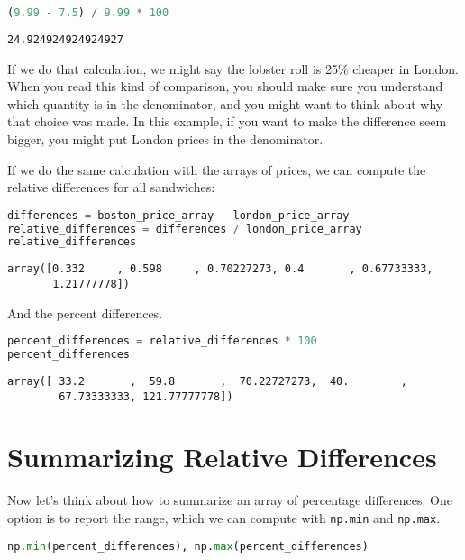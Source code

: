 \documentclass[
]{book}
\newcommand{\passthrough}[1]{#1}
\begin{document}
\begin{lstlisting}[language=Python]
(9.99 - 7.5) / 9.99 * 100
\end{lstlisting}

\begin{lstlisting}
24.924924924924927
\end{lstlisting}

If we do that calculation, we might say the lobster roll is 25\% cheaper
in London. When you read this kind of comparison, you should make sure
you understand which quantity is in the denominator, and you might want
to think about why that choice was made. In this example, if you want to
make the difference seem bigger, you might put London prices in the
denominator.

If we do the same calculation with the arrays of prices, we can compute
the relative differences for all sandwiches:

\begin{lstlisting}[language=Python]
differences = boston_price_array - london_price_array
relative_differences = differences / london_price_array
relative_differences
\end{lstlisting}

\begin{lstlisting}
array([0.332     , 0.598     , 0.70227273, 0.4       , 0.67733333,
       1.21777778])
\end{lstlisting}

And the percent differences.

\begin{lstlisting}[language=Python]
percent_differences = relative_differences * 100
percent_differences
\end{lstlisting}

\begin{lstlisting}
array([ 33.2       ,  59.8       ,  70.22727273,  40.        ,
        67.73333333, 121.77777778])
\end{lstlisting}

\section{Summarizing Relative
Differences}\label{summarizing-relative-differences}

Now let's think about how to summarize an array of percentage
differences. One option is to report the range, which we can compute
with \passthrough{\lstinline!np.min!} and
\passthrough{\lstinline!np.max!}.

\begin{lstlisting}[language=Python]
np.min(percent_differences), np.max(percent_differences)
\end{lstlisting}
\end{document}
